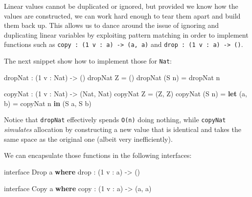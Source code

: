 \documentclass[
]{article}
\newenvironment{Shaded}{}{}
\newcommand{\DataTypeTok}[1]{\textcolor[rgb]{0.56,0.13,0.00}{#1}}
\newcommand{\DecValTok}[1]{\textcolor[rgb]{0.25,0.63,0.44}{#1}}
\newcommand{\FunctionTok}[1]{\textcolor[rgb]{0.02,0.16,0.49}{#1}}
\newcommand{\KeywordTok}[1]{\textcolor[rgb]{0.00,0.44,0.13}{\textbf{#1}}}
\newcommand{\NormalTok}[1]{#1}
\newcommand{\OperatorTok}[1]{\textcolor[rgb]{0.40,0.40,0.40}{#1}}
\newcommand{\OtherTok}[1]{\textcolor[rgb]{0.00,0.44,0.13}{#1}}
\begin{document}
Linear values cannot be duplicated or ignored, but provided we know how
the values are constructed, we can work hard enough to tear them apart
and build them back up. This allows us to dance around the issue of
ignoring and duplicating linear variables by exploiting pattern matching
in order to implement functions such as
\texttt{copy\ :\ (1\ v\ :\ a)\ \textasciigrave{}-\textgreater{}\ (a,\ a)}
and \texttt{drop\ :\ (1\ v\ :\ a)\ -\textgreater{}\ ()}.

The next snippet show how to implement those for \texttt{Nat}:

\begin{Shaded}
\begin{Highlighting}[]
\NormalTok{dropNat }\OperatorTok{:}\NormalTok{ (}\DecValTok{1}\NormalTok{ v }\OperatorTok{:} \DataTypeTok{Nat}\NormalTok{) }\OtherTok{{-}\textgreater{}}\NormalTok{ ()}
\NormalTok{dropNat }\DataTypeTok{Z} \OtherTok{=}\NormalTok{ ()}
\NormalTok{dropNat (}\DataTypeTok{S}\NormalTok{ n) }\OtherTok{=}\NormalTok{ dropNat n}

\NormalTok{copyNat }\OperatorTok{:}\NormalTok{ (}\DecValTok{1}\NormalTok{ v }\OperatorTok{:} \DataTypeTok{Nat}\NormalTok{) }\OtherTok{{-}\textgreater{}}\NormalTok{ (}\DataTypeTok{Nat}\NormalTok{, }\DataTypeTok{Nat}\NormalTok{)}
\NormalTok{copyNat }\DataTypeTok{Z} \OtherTok{=}\NormalTok{ (}\DataTypeTok{Z}\NormalTok{, }\DataTypeTok{Z}\NormalTok{)}
\NormalTok{copyNat (}\DataTypeTok{S}\NormalTok{ n) }\OtherTok{=} \KeywordTok{let}\NormalTok{ (a, b) }\OtherTok{=}\NormalTok{ copyNat n }\KeywordTok{in}
\NormalTok{                    (}\DataTypeTok{S}\NormalTok{ a, }\DataTypeTok{S}\NormalTok{ b)}
\end{Highlighting}
\end{Shaded}

Notice that \texttt{dropNat} effectively spends \texttt{O(n)} doing
nothing, while \texttt{copyNat} \emph{simulates} allocation by
constructing a new value that is identical and takes the same space as
the original one (albeit very inefficiently).

We can encapsulate those functions in the following interfaces:

\begin{Shaded}
\begin{Highlighting}[]
\NormalTok{interface }\DataTypeTok{Drop}\NormalTok{ a }\KeywordTok{where}
    \FunctionTok{drop} \OperatorTok{:}\NormalTok{ (}\DecValTok{1}\NormalTok{ v }\OperatorTok{:}\NormalTok{ a) }\OtherTok{{-}\textgreater{}}\NormalTok{ ()}

\NormalTok{interface }\DataTypeTok{Copy}\NormalTok{ a }\KeywordTok{where}
\NormalTok{    copy }\OperatorTok{:}\NormalTok{ (}\DecValTok{1}\NormalTok{ v }\OperatorTok{:}\NormalTok{ a) }\OtherTok{{-}\textgreater{}}\NormalTok{ (a, a)}
\end{Highlighting}
\end{Shaded}
\end{document}
